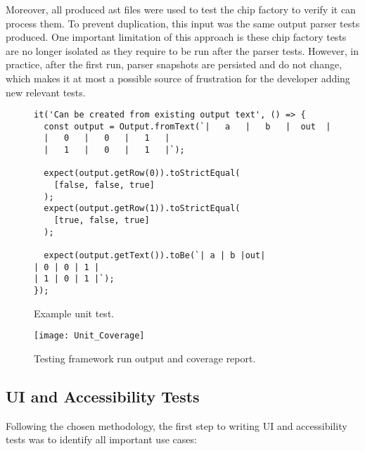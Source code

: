 Moreover, all produced \gls{ast} files were used to test the chip factory to verify it can process them.
To prevent duplication, this input was the same output parser tests produced.
One important limitation of this approach is these chip factory tests are no longer isolated as they require to be run after the parser tests.
However, in practice, after the first run, parser snapshots are persisted and do not change, which makes it at most a possible source of frustration for the developer adding new relevant tests.

\begin{figure}[H]
\centering
\begin{verbatim}
it('Can be created from existing output text', () => {
  const output = Output.fromText(`|   a   |   b   |  out  |
  |   0   |   0   |   1   |
  |   1   |   0   |   1   |`);

  expect(output.getRow(0)).toStrictEqual(
    [false, false, true]
  );
  expect(output.getRow(1)).toStrictEqual(
    [true, false, true]
  );

  expect(output.getText()).toBe(`| a | b |out|
| 0 | 0 | 1 |
| 1 | 0 | 1 |`);
});
\end{verbatim}
    \caption{Example unit test.}
    \label{fig:test-unit-example}
\end{figure}

\begin{figure}[H]
    \texttt{[image: Unit\_Coverage]}
    \caption{Testing framework run output and coverage report.}
    \label{fig:test-coverage}
\end{figure}

\subsection{UI and Accessibility Tests}

Following the chosen methodology, the first step to writing UI and accessibility tests was to identify all important use cases:

